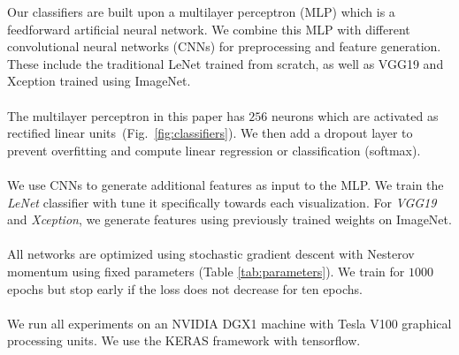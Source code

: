\documentclass[journal]{vgtc}                %
\begin{document}
Our classifiers are built upon a multilayer perceptron (MLP) which is a feedforward artificial neural network. We combine this MLP with different convolutional neural networks (CNNs) for preprocessing and feature generation. These include the traditional LeNet trained from scratch, as well as VGG19 and Xception trained using ImageNet.
\\~\\
 The multilayer perceptron in this paper has $256$ neurons which are activated as rectified linear units~(Fig.~\ref{fig:classifiers}). We then add a dropout layer to prevent overfitting and compute linear regression or classification (softmax).
\\~\\
 We use CNNs to generate additional features as input to the MLP. We train the \emph{LeNet} classifier with tune it specifically towards each visualization. For \emph{VGG19} and \emph{Xception}, we generate features using previously trained weights on ImageNet.
\\~\\
 All networks are optimized using stochastic gradient descent with Nesterov momentum using fixed parameters (Table \ref{tab:parameters}). We train for $1000$ epochs but stop early if the loss does not decrease for ten epochs.
\\~\\
 We run all experiments on an NVIDIA DGX1 machine with Tesla V100 graphical processing units. We use the KERAS framework with tensorflow.
\end{document}
